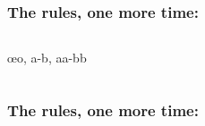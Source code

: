 \begin{frame}
  \frametitle{The rules, one more time: \eor}
\begin{columns}

  \begin{column}{3cm}
    \begin{fitchproof}
      \open
      \ellipsesline
      \close
      \open
      \ellipsesline
      \close
       \oe{o, a-b, aa-bb}
    \end{fitchproof}
  \end{column}
  \begin{column}{2.5cm}
      \begin{fitchproof}
         
      \end{fitchproof}
      \begin{fitchproof}
         
      \end{fitchproof}
  \end{column}
\end{columns}
\end{frame}


\begin{frame}
  \frametitle{The rules, one more time: \enot}
\begin{columns}
  \begin{column}{3cm}
    \begin{fitchproof}
       
    \end{fitchproof}
    \end{column}
  \begin{column}{3cm}
    \begin{fitchproof}
      \open
      \ellipsesline
      \close
       
    \end{fitchproof}
  \end{column}
\end{columns}
\end{frame}

